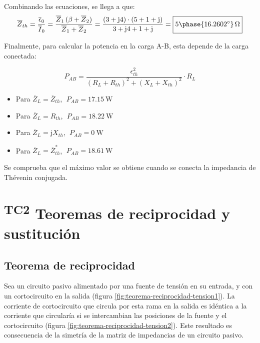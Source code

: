\begin{example}
Combinando las ecuaciones, se llega a que:
\begin{equation*}
  \overline{Z}_{th} = \dfrac{\overline{\epsilon}_0}{\overline{I}_0} = \dfrac{\overline{Z}_1\,(\beta + \overline{Z}_2)}{\overline{Z}_1+\overline{Z}_2}=\dfrac{(3+\mathrm{j}4)\cdot (5+1+\mathrm{j})}{3+\mathrm{j}4+1+\mathrm{j}} = \boxed{\vphantom{\frac{a}{a}} 5\phase{16.2602^\circ}\,\Omega}
\end{equation*}

Finalmente, para calcular la potencia en la carga A-B, esta depende de
la carga conectada:

\begin{equation*}
  P_{AB} = \dfrac{\epsilon_{th}^2}{{(R_L+R_{th})^2+(X_L+X_{th})^2}} \cdot R_L
\end{equation*}

\begin{itemize}
\item Para $\overline{Z}_L = \overline{Z}_{th}$,
  $\;P_{AB} = \qty{17.15}{\watt}$
\item Para $\overline{Z}_L = R_{th}$, $\;P_{AB} = \qty{18.22}{\watt}$
\item Para $\overline{Z}_L = \mathrm{j}X_{th}$,
  $\;P_{AB} = \qty{0}{\watt}$
\item Para $\overline{Z}_L = \overline{Z}_{th}^*$,
  $\;P_{AB} = \qty{18.61}{\watt}$
\end{itemize}

Se comprueba que el máximo valor se obtiene cuando se conecta la
impedancia de Thévenin conjugada.

\end{example}
	
\section{\textsuperscript{TC2} Teoremas de reciprocidad y sustitución}
\label{sec:orgaf3c617}

\subsection{Teorema de reciprocidad}
\label{sec:teorema-reciprocidad}

Sea un circuito pasivo alimentado por una fuente de tensión en su entrada, y con un cortocircuito en la salida (figura \ref{fig:teorema-reciprocidad-tension1}). La corriente de cortocircuito que circula por esta rama en la salida es idéntica a la corriente que circularía si se intercambian las posiciones de la fuente y el cortocircuito (figura \ref{fig:teorema-reciprocidad-tension2}). Este resultado es consecuencia de la simetría de la matriz de impedancias de un circuito pasivo.


